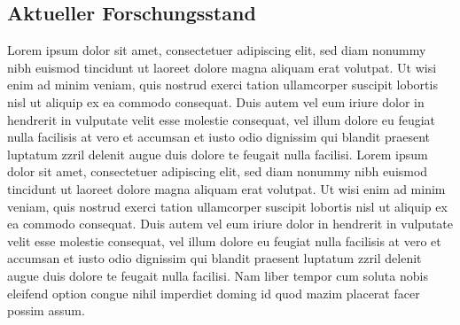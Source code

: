 \documentclass[a4paper,bibliography=totocnumbered,12pt]{article}
\begin{document}
\subsection{Aktueller Forschungsstand}
Lorem ipsum dolor sit amet, consectetuer adipiscing elit, sed diam nonummy nibh euismod tincidunt ut laoreet dolore magna aliquam erat volutpat. Ut wisi enim ad minim veniam, quis nostrud exerci tation ullamcorper suscipit lobortis nisl ut aliquip ex ea commodo consequat. Duis autem vel eum iriure dolor in hendrerit in vulputate velit esse molestie consequat, vel illum dolore eu feugiat nulla facilisis at vero et accumsan et iusto odio dignissim qui blandit praesent luptatum zzril delenit augue duis dolore te feugait nulla facilisi. Lorem ipsum dolor sit amet, consectetuer adipiscing elit, sed diam nonummy nibh euismod tincidunt ut laoreet dolore magna aliquam erat volutpat. Ut wisi enim ad minim veniam, quis nostrud exerci tation ullamcorper suscipit lobortis nisl ut aliquip ex ea commodo consequat. Duis autem vel eum iriure dolor in hendrerit in vulputate velit esse molestie consequat, vel illum dolore eu feugiat nulla facilisis at vero et accumsan et iusto odio dignissim qui blandit praesent luptatum zzril delenit augue duis dolore te feugait nulla facilisi. Nam liber tempor cum soluta nobis eleifend option congue nihil imperdiet doming id quod mazim placerat facer possim assum.
\end{document}
